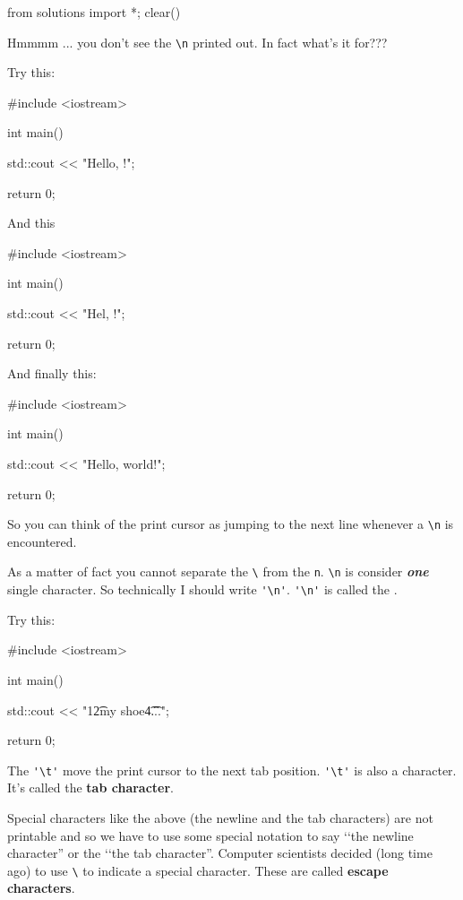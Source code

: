 \begin{python0}
from solutions import *; clear()
\end{python0}


Hmmmm ... you don't see the \verb!\n! printed out. In fact what's it for???

Try this:
\begin{console}
#include <iostream>

int main()
{
    std::cout << "Hello, \nworld!\n";

    return 0;
}
\end{console}
And this
\begin{console}
#include <iostream>

int main()
{
    std::cout << "Hel\nlo, \nworld!\n";

    return 0;
}
\end{console}
And finally this:
\begin{console}
#include <iostream>

int main()
{
    std::cout << "Hello, world!";

    return 0;
}
\end{console} 
So you can think of the print cursor as jumping to the next line whenever a 
\verb!\n! is encountered. 

As a matter of fact you cannot separate the 
\verb!\! from the \verb!n!. 
\verb!\n! is consider \textit{\textbf{one}} single character. 
So technically I should write \verb!'\n'!. 
\verb!'\n'! is called the 
.







Try this:
\begin{console}
#include <iostream>

int main()
{
    std::cout << "1\t2\tbuckle my shoe\t4\t...\n";

    return 0;
}
\end{console}

The \verb!'\t'! move the print cursor to the next tab position. 
\verb!'\t'! is also a character. 
It's called the \textbf{tab character}.

Special characters like the above (the newline and the tab characters) are not printable and so we have to use some special notation to say 
\lq\lq the newline character'' or the 
\lq\lq the tab character''. 
Computer scientists decided (long time ago) to use 
\verb!\! to indicate a special character. 
These are called \textbf{escape characters}.

